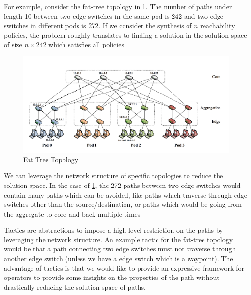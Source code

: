 \documentclass[]{sig}
\begin{document}
For example, consider the fat-tree topology in \cref{fattree}. The number of paths under length 10 between two edge  switches in the same pod is 242 and two edge switches in different pods is 272. If we consider the synthesis of $n$ reachability policies, the problem roughly translates to finding a solution in the solution space of size $n \times 242$ which satisfies all policies. 
\begin{figure}[H]
	\includegraphics[width=\columnwidth]{fattree.png}
	\caption{Fat Tree Topology}
	\label{fattree}
\end{figure}
We can leverage the network structure of specific topologies to reduce the solution space. In the case of \cref{fattree}, the 272 paths between two edge switches would contain many paths which can be avoided, like paths which traverse through edge switches other than the source/destination, or paths which would be  going from the aggregate to core and back multiple times. 

Tactics are abstractions to impose a high-level restriction on the paths by leveraging the network structure. An example tactic for the fat-tree topology would be that a path connecting two edge switches must not traverse through another edge switch (unless we have a edge switch which is a waypoint). The advantage of tactics is that we would like to provide an expressive framework for operators to provide some insights on the properties of the path without drastically reducing the solution space of paths. 
\end{document}
